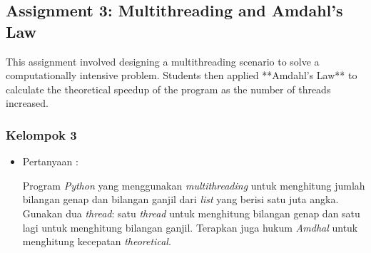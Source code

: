 \documentclass[12pt]{article}
\begin{document}
\subsection{Assignment 3: Multithreading and Amdahl's Law}
This assignment involved designing a multithreading scenario to solve a computationally intensive problem. Students then applied **Amdahl's Law** to calculate the theoretical speedup of the program as the number of threads increased.
\subsubsection{Kelompok 3}

\begin{itemize}
    \item Pertanyaan :
    
    Program \textit{Python} yang menggunakan \textit{multithreading} untuk menghitung jumlah bilangan genap dan bilangan ganjil dari \textit{list} yang berisi satu juta angka. Gunakan dua \textit{thread}: satu \textit{thread} untuk menghitung bilangan genap dan satu lagi untuk menghitung bilangan ganjil. Terapkan juga hukum \textit{Amdhal} untuk menghitung kecepatan \textit{theoretical}.
\end{itemize}
    
\end{document}
